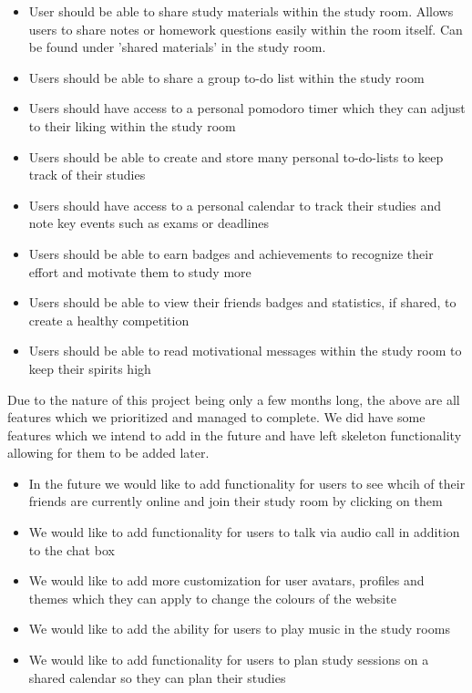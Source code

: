 \begin{itemize}
\item User should be able to share study materials within the study room. Allows users to share notes or homework questions easily within the room itself. Can be found under 'shared materials' in the study room.
\item Users should be able to share a group to-do list within the study room
\item Users should have access to a personal pomodoro timer which they can adjust to their liking within the study room
\item Users should be able to create and store many personal to-do-lists to keep track of their studies
\item Users should have access to a personal calendar to track their studies and note key events such as exams or deadlines
\item Users should be able to earn badges and achievements to recognize their effort and motivate them to study more
\item Users should be able to view their friends badges and statistics, if shared, to create a healthy competition
\item Users should be able to read motivational messages within the study room to keep their spirits high
\end{itemize}


Due to the nature of this project being only a few months long, the above are all features which we prioritized and managed to complete. We did have some features which we intend to add in the future and have left skeleton functionality allowing for them to be added later.

\begin{itemize}
\item In the future we would like to add functionality for users to see whcih of their friends are currently online and join their study room by clicking on them
\item We would like to add functionality for users to talk via audio call in addition to the chat box
\item We would like to add more customization for user avatars, profiles and themes which they can apply to change the colours of the website
\item We would like to add the ability for users to play music in the study rooms
\item We would like to add functionality for users to plan study sessions on a shared calendar so they can plan their studies
\end{itemize}

